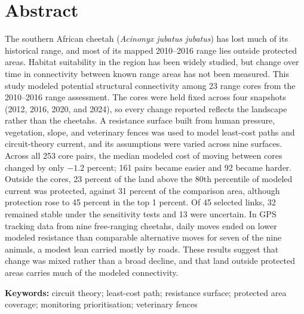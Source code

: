 \section*{Abstract}

The southern African cheetah (\textit{Acinonyx jubatus jubatus}) has lost much of its historical range, and most of its mapped 2010--2016 range lies outside protected areas. Habitat suitability in the region has been widely studied, but change over time in connectivity between known range areas has not been measured. This study modeled potential structural connectivity among 23 range cores from the 2010--2016 range assessment. The cores were held fixed across four snapshots (2012, 2016, 2020, and 2024), so every change reported reflects the landscape rather than the cheetahs. A resistance surface built from human pressure, vegetation, slope, and veterinary fences was used to model least-cost paths and circuit-theory current, and its assumptions were varied across nine surfaces. Across all 253 core pairs, the median modeled cost of moving between cores changed by only $-1.2$ percent; 161 pairs became easier and 92 became harder. Outside the cores, 23 percent of the land above the 80th percentile of modeled current was protected, against 31 percent of the comparison area, although protection rose to 45 percent in the top 1 percent. Of 45 selected links, 32 remained stable under the sensitivity tests and 13 were uncertain. In GPS tracking data from nine free-ranging cheetahs, daily moves ended on lower modeled resistance than comparable alternative moves for seven of the nine animals, a modest lean carried mostly by roads. These results suggest that change was mixed rather than a broad decline, and that land outside protected areas carries much of the modeled connectivity.

\vspace{1em}
\noindent\textbf{Keywords:} circuit theory; least-cost path; resistance surface;
protected area coverage; monitoring prioritisation; veterinary fences
